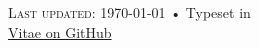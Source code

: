 \documentclass[10pt, letterpaper]{article}
\newcommand{\years}[1]{\marginnote{\scriptsize #1}}
\begin{document}












\vfill{}

\begin{center}
{\scriptsize  \textsc{Last updated}: \today\- •\- 
Typeset in \href{http://nitens.org/taraborelli/cvtex}{
\XeTeX }\\
\href{https://github.com/eghuang/cv/blob/master/cv.pdf}{Vitae on GitHub}}
\end{center}
\end{document}
